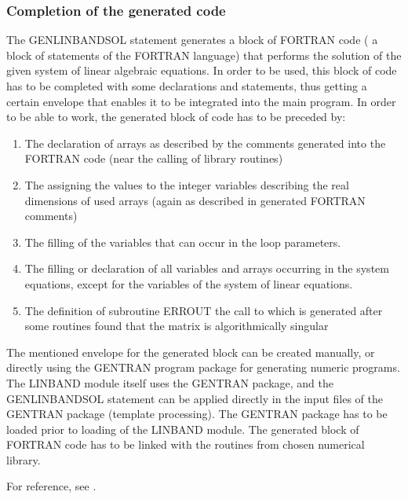 \subsubsection{Completion of the generated code}


     The GENLINBANDSOL statement generates a block  of FORTRAN  code ( a
block of  statements of the FORTRAN language) that performs the solution
of the given system of linear algebraic equations. In order  to be used,
this  block  of  code  has  to  be  completed with some declarations and
statements, thus getting  a  certain  envelope  that  enables  it  to be
integrated into the main program.
     In order  to be able to work, the generated block of code has to be
preceded by:
\begin{enumerate}
  \item The declaration  of arrays as  described by the  comments generated
  into the FORTRAN code (near the calling of library routines)

  \item The assigning  the values to  the integer variables  describing the
  real  dimensions  of  used  arrays  (again  as  described in generated
  FORTRAN comments)

  \item The filling of the variables that can occur in the loop parameters.

  \item The filling or declaration of all variables and arrays occurring in
  the system equations, except for the variables of the system of linear
  equations.

  \item The definition of subroutine ERROUT the call to which is  generated
  after some routines found that the matrix is algorithmically singular
\end{enumerate}
     The  mentioned  envelope  for  the  generated  block can be created
manually, or directly using  the GENTRAN program package  for generating
numeric programs. The  LINBAND module itself  uses the GENTRAN  package,
and the  GENLINBANDSOL statement  can be  applied directly  in the input
files of the GENTRAN package (template processing). The GENTRAN  package
has to be loaded prior to loading of the LINBAND module.
     The  generated  block  of  FORTRAN  code  has to be linked with the
routines from chosen numerical library.

For reference, see \cite{Liska:91b}.



